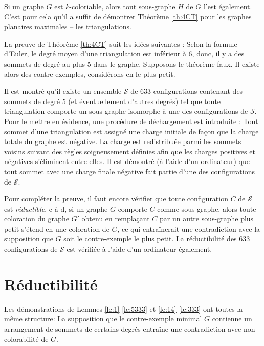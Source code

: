 \documentclass[10pt,a4paper]{article}
\newtheorem{proposition}{Proposition}
\begin{document}
Si un graphe $G$ est $k$-coloriable, alors tout sous-graphe $H$ de $G$ l'est également. C'est pour cela qu'il a suffit de démontrer Théorème \ref{th:4CT} pour les graphes planaires maximales -- les triangulations.




La preuve de Théorème \ref{th:4CT} suit les idées suivantes : Selon la formule d'Euler, le degré moyen d'une triangulation est inférieur à 6, donc, il y a des sommets de degré au plus 5 dans le graphe. Supposons le théorème faux. Il existe alors des contre-exemples, considérons en le plus petit. 

Il est montré qu'il existe un ensemble $\mathcal{S}$ de 633 configurations contenant des sommets de degré 5 (et éventuellement d'autres degrés) tel que toute triangulation comporte un sous-graphe isomorphe à une des configurations de $\mathcal{S}$. Pour le mettre en évidence, une procédure de déchargement est introduite : Tout sommet d'une triangulation est assigné une charge initiale de façon que la charge totale du graphe est négative. La charge est redistribuée parmi les sommets voisins suivant des règles soigneusement définies afin que les charges positives et négatives s'éliminent entre elles. Il est démontré (à l'aide d'un ordinateur) que tout sommet avec une charge finale négative fait partie d'une des configurations de $\mathcal{S}$.

Pour compléter la preuve, il faut encore vérifier que toute configuration $C$ de $\mathcal{S}$ est \emph{réductible}, c-à-d, si un graphe $G$ comporte $C$ comme sous-graphe, alors toute coloration du graphe $G'$ obtenu en remplaçant $C$ par un autre sous-graphe plus petit s'étend en une coloration de $G$, ce qui entraînerait une contradiction avec la supposition que $G$ soit le contre-exemple le plus petit.
La réductibilité des 633 configurations de $\mathcal{S}$ est vérifiée à l'aide d'un ordinateur également.






\section{Réductibilité}
\label{chap:red}
Les démonstrations de Lemmes \ref{le:1}-\ref{le:5333} et \ref{le:14}-\ref{le:333} ont toutes la même structure: La supposition que le contre-exemple minimal $G$ contienne un arrangement de sommets de certains degrés entraîne une contradiction avec non-colorabilité de $G$.
  
\end{document}
